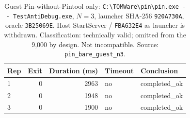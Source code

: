 \begin{table}[!t]
\centering
\caption{Guest Pin-without-Pintool only: \texttt{C:\textbackslash TOMWare\textbackslash pin\textbackslash pin.exe -{}- TestAntiDebug.exe}, $N=3$, launcher SHA-256 \texttt{920A730A}, oracle \texttt{3B25069E}. Host StartServer / \texttt{FBA632E4} as launcher is withdrawn. Classification: technically valid; omitted from the 9{,}000 by design. Not incompatible. Source: \texttt{pin\_bare\_guest\_n3}.}
\label{tab:pin_probe}
\begin{tabular}{lrrll}
\hline
Rep & Exit & Duration (ms) & Timeout & Conclusion \\
\hline
1 & 0 & 2963 & no & completed\_ok \\
2 & 0 & 1948 & no & completed\_ok \\
3 & 0 & 1900 & no & completed\_ok \\
\hline
\end{tabular}
\end{table}



